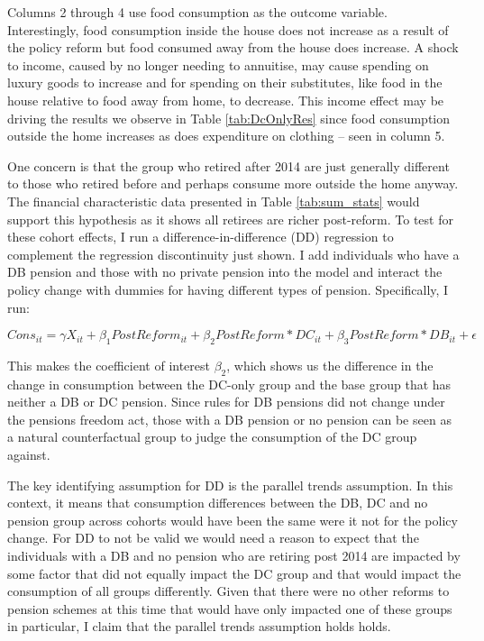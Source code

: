 \documentclass[12pt]{article}
\begin{document}
Columns 2 through 4 use food consumption as the outcome variable. Interestingly,
food consumption inside the house does not increase as a result of the policy
reform but food consumed away from the house does increase. A shock to income,
caused by no longer needing to annuitise, may cause spending on luxury goods to
increase and for spending on their substitutes, like food in the house relative
to food away from home, to decrease. This income effect may be driving the
results we observe in Table \ref{tab:DcOnlyRes} since food consumption outside the
home increases as does expenditure on clothing -- seen in column 5.

One concern is that the group who retired after 2014 are just generally
different to those who retired before and perhaps consume more outside the home
anyway. The financial characteristic data presented in Table \ref{tab:sum_stats}
would support this hypothesis as it shows all retirees are richer post-reform.
To test for these cohort effects, I run a difference-in-difference (DD) regression to
complement the regression discontinuity just shown. I add individuals who have a
DB pension and those with no private pension into the model and interact the
policy change with dummies for having different types of pension. Specifically,
I run:

\begin{equation*}
    Cons_{it} =  \gamma X_{it} + \beta_{1} PostReform_{it} + \beta_{2} PostReform*DC_{it} + \beta_{3} PostReform*DB_{it}  + \epsilon
\end{equation*}


This makes the coefficient of interest $\beta_{2}$, which shows us the
difference in the change in consumption between the DC-only group and the base
group that has neither a DB or DC pension. Since rules for DB pensions did not
change under the pensions freedom act, those with a DB pension or no pension can
be seen as a natural counterfactual group to judge the consumption of the DC
group against.

The key identifying assumption for DD is the parallel trends assumption. In this
context, it means that consumption differences between the DB, DC and no pension
group across cohorts would have been the same were it not for the policy change.
For DD to not be valid we would need a reason to expect that the individuals
with a DB and no pension who are retiring post 2014 are impacted by some factor
that did not equally impact the DC group and that would impact the consumption
of all groups differently. Given that there were no other reforms to pension
schemes at this time that would have only impacted one of these groups in
particular, I claim that the parallel trends assumption holds holds.
\end{document}
